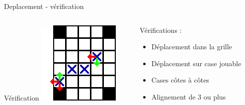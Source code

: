 \begin{frame}{Deplacement - vérification}
	\begin{columns}
		\begin{column}{0.49\textwidth}
			\begin{block}{Vérification}
				\includegraphics[width=\textwidth]{imgs/verifDepl}
			\end{block}
		\end{column}
		\begin{column}{0.49\textwidth}
			Vérifications :
			\begin{itemize}
				\item
					Déplacement dans la grille
				\item
					Déplacement sur case jouable
				\item
					Cases côtes à côtes
				\item
					Alignement de 3 ou plus
			\end{itemize}
		\end{column}
	\end{columns}
\end{frame}

